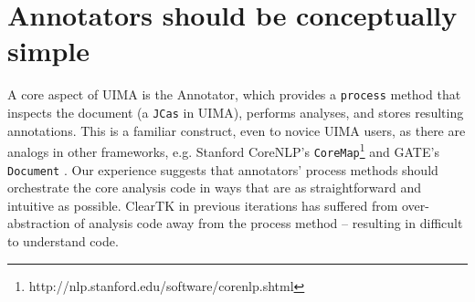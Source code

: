 \documentclass[10pt, a4paper]{article}
\newcommand{\code}[1]{\texttt{\small #1}}
\begin{document}
\section{Annotators should be conceptually simple}
\label{sec:annotators}
A core aspect of UIMA is the Annotator, which provides a \code{process} method that inspects the document (a \code{JCas} in UIMA), performs analyses, and stores resulting annotations.  This is a familiar construct, even to novice UIMA users, as there are analogs in other frameworks, e.g. Stanford CoreNLP's \code{CoreMap}\footnote{http://nlp.stanford.edu/software/corenlp.shtml} and GATE's \code{Document} \cite{Cunningham2011a}.  Our experience suggests that annotators' process methods should orchestrate the core analysis code in ways that are as straightforward and intuitive as possible.  ClearTK in previous iterations has suffered from over-abstraction of analysis code away from the process method -- resulting in difficult to understand code.
\end{document}
